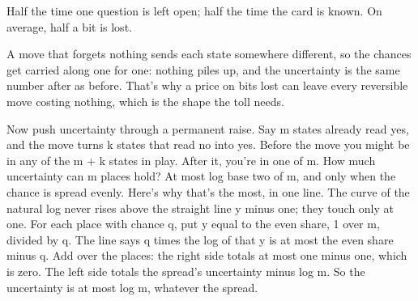 \documentclass[11pt,twoside]{article}
\theoremstyle{thielethm}
\theoremstyle{thieledef}
\theoremstyle{thieledef}
\theoremstyle{thieledef}
\theoremstyle{thielethm}
\theoremstyle{thieleobs}
\theoremstyle{thielethm}
\begin{document}
\begin{center}

\small Half the time one question is left open; half the time the card is known.
On average, half a bit is lost.
\end{center}

A move that forgets nothing sends each state somewhere different, so the chances get carried along one for one: nothing piles up, and the uncertainty is the same number after as before. That's why a price on bits lost can leave every reversible move costing nothing, which is the shape the toll needs.

Now push uncertainty through a permanent raise. Say m states already read yes, and the move turns k states that read no into yes. Before the move you might be in any of the m + k states in play. After it, you're in one of m. How much uncertainty can m places hold? At most log base two of m, and only when the chance is spread evenly. Here's why that's the most, in one line. The curve of the natural log never rises above the straight line y minus one; they touch only at one. For each place with chance q, put y equal to the even share, 1 over m, divided by q. The line says q times the log of that y is at most the even share minus q. Add over the places: the right side totals at most one minus one, which is zero. The left side totals the spread's uncertainty minus log m. So the uncertainty is at most log m, whatever the spread.
\end{document}
